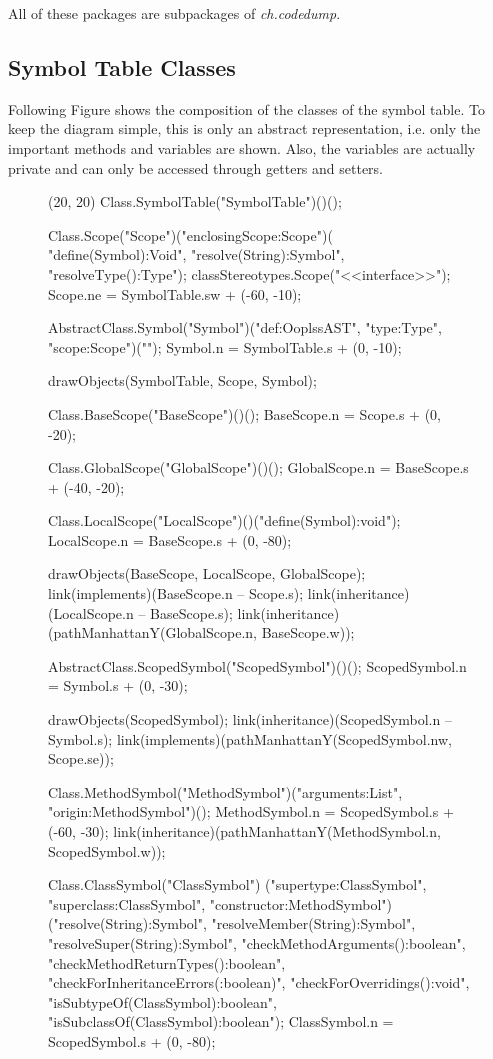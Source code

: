 All of these packages are subpackages of \emph{ch.codedump}.

\subsection{Symbol Table Classes}

Following Figure shows the composition of the classes of the symbol table.
To keep the diagram simple, this is only an abstract representation, i.e. only
the important methods and variables are shown. Also, the variables are actually
private and can only be accessed through getters and setters.

\begin{figure}[H]
	\centering
	\begin{emp}[classdiag](20, 20)
	Class.SymbolTable("SymbolTable")()();

	Class.Scope("Scope")("enclosingScope:Scope")( "define(Symbol):Void",
			"resolve(String):Symbol", "resolveType():Type");
	classStereotypes.Scope("<<interface>>");
	Scope.ne = SymbolTable.sw + (-60, -10);

	AbstractClass.Symbol("Symbol")("def:OoplssAST", "type:Type", "scope:Scope")("");
	Symbol.n = SymbolTable.s + (0, -10);

	drawObjects(SymbolTable, Scope, Symbol);

	Class.BaseScope("BaseScope")()();
	BaseScope.n = Scope.s + (0, -20);

	Class.GlobalScope("GlobalScope")()();
	GlobalScope.n = BaseScope.s + (-40, -20);

	Class.LocalScope("LocalScope")()("define(Symbol):void");
	LocalScope.n = BaseScope.s + (0, -80);

	drawObjects(BaseScope, LocalScope, GlobalScope);
	link(implements)(BaseScope.n -- Scope.s);
	link(inheritance)(LocalScope.n -- BaseScope.s);
	link(inheritance)(pathManhattanY(GlobalScope.n, BaseScope.w));

	AbstractClass.ScopedSymbol("ScopedSymbol")()();
	ScopedSymbol.n = Symbol.s + (0, -30);

	drawObjects(ScopedSymbol);
	link(inheritance)(ScopedSymbol.n -- Symbol.s);
	link(implements)(pathManhattanY(ScopedSymbol.nw, Scope.se));

	Class.MethodSymbol("MethodSymbol")("arguments:List", "origin:MethodSymbol")();
	MethodSymbol.n = ScopedSymbol.s + (-60, -30);
	link(inheritance)(pathManhattanY(MethodSymbol.n, ScopedSymbol.w));

	Class.ClassSymbol("ClassSymbol")
		("supertype:ClassSymbol", "superclass:ClassSymbol", "constructor:MethodSymbol")
		("resolve(String):Symbol", "resolveMember(String):Symbol",
		"resolveSuper(String):Symbol",
		"checkMethodArguments():boolean", "checkMethodReturnTypes():boolean",
		"checkForInheritanceErrors(:boolean)", "checkForOverridings():void",
		"isSubtypeOf(ClassSymbol):boolean", "isSubclassOf(ClassSymbol):boolean");
	ClassSymbol.n = ScopedSymbol.s + (0, -80);


\end{emp}
\end{figure}

